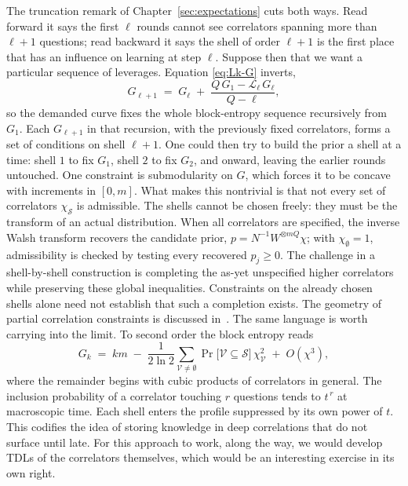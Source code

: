 \documentclass[11pt]{article}
\begin{document}
The truncation remark of Chapter~\ref{sec:expectations} cuts both ways.
Read forward it says the first $\ell$ rounds cannot see correlators
spanning more than $\ell+1$ questions; read backward it says the shell
of order $\ell+1$ is the first place that has an influence on learning at
step $\ell$. Suppose then that we want a particular sequence of
leverages. Equation \eqref{eq:Lk-G} inverts,
%
\begin{equation}
  G_{\ell+1} \;=\; G_\ell
  \;+\; \frac{Q\,G_1 - \mathcal L_\ell\, G_\ell}{Q - \ell},
  \label{eq:designrec}
\end{equation}
%
so the demanded curve fixes the whole block-entropy sequence
recursively from $G_1$. Each $G_{\ell+1}$ in that recursion, with the previously
fixed correlators, forms a set of conditions on shell $\ell+1$. 
One could then
try to build the prior a shell at a time: shell $1$ to fix $G_1$, shell
$2$ to fix $G_2$, and onward, leaving the earlier rounds untouched. 
One constraint is submodularity on $G$, which forces it to be concave with
increments in $[0,m]$. What makes this nontrivial is that not every set of correlators $\chi_{\mathcal S}$ is
admissible. The shells cannot be chosen freely: they must be the
transform of an actual distribution. When all correlators are
specified, the inverse Walsh transform recovers the candidate prior,
$p=N^{-1}W^{\otimes mQ}\chi$; with $\chi_{\emptyset}=1$,
admissibility is checked by testing every recovered $p_j\geq0$.
The challenge in a shell-by-shell construction is completing the
as-yet unspecified higher correlators while preserving these global
inequalities. Constraints on the already chosen shells alone need
not establish that such a completion exists. The geometry of partial
correlation constraints is discussed in~\cite{pitowsky91}.
The same language is worth carrying into the limit. To
second order the block entropy reads
%
\begin{equation}
  G_k \;=\; km \;-\; \frac{1}{2\ln 2}
  \sum_{\mathcal V \neq \emptyset}
  \Pr\big[\mathcal V \subseteq \mathcal S\big]\, \chi_{\mathcal V}^2
  \;+\; O(\chi^3),
  \label{eq:Gshell}
\end{equation}
%
where the remainder begins with cubic products of correlators in
general. The inclusion probability of a correlator touching $r$ questions
tends to $t^{\,r}$ at macroscopic time. Each shell enters the
profile suppressed by its own power of $t$. This codifies the idea of
storing knowledge in deep correlations that do not surface until late.
For this approach to work, along the way, we would develop TDLs of the 
correlators themselves, which would be an interesting exercise in its own right.
\end{document}

